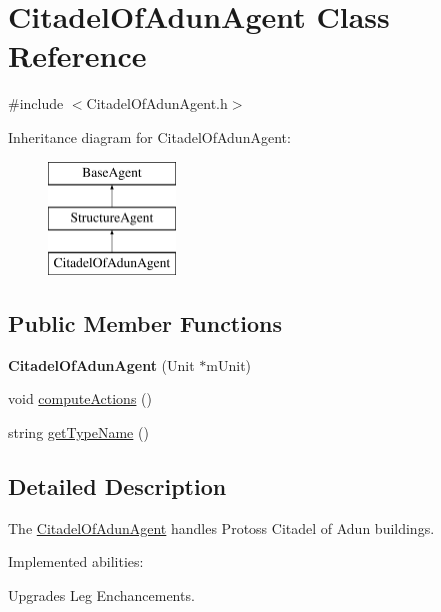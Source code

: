 \hypertarget{class_citadel_of_adun_agent}{
\section{CitadelOfAdunAgent Class Reference}
\label{class_citadel_of_adun_agent}
}


{\ttfamily \#include $<$CitadelOfAdunAgent.h$>$}

Inheritance diagram for CitadelOfAdunAgent:\begin{figure}[H]
\begin{center}
\leavevmode
\includegraphics[height=3.000000cm]{class_citadel_of_adun_agent}
\end{center}
\end{figure}
\subsection*{Public Member Functions}
\begin{DoxyCompactItemize}
\item 
\hypertarget{class_citadel_of_adun_agent_aee1aeb3c2f39669319e5f39f4444924b}{
{\bfseries CitadelOfAdunAgent} (Unit $\ast$mUnit)}
\label{class_citadel_of_adun_agent_aee1aeb3c2f39669319e5f39f4444924b}

\item 
void \hyperlink{class_citadel_of_adun_agent_a9196d4bed7f7a323ab39601e5c82c2db}{computeActions} ()
\item 
string \hyperlink{class_citadel_of_adun_agent_a57e71e35ab9f57e2212b5564193df449}{getTypeName} ()
\end{DoxyCompactItemize}


\subsection{Detailed Description}
The \hyperlink{class_citadel_of_adun_agent}{CitadelOfAdunAgent} handles Protoss Citadel of Adun buildings.

Implemented abilities:
\begin{DoxyItemize}
\item Upgrades Leg Enchancements.
\end{DoxyItemize}

